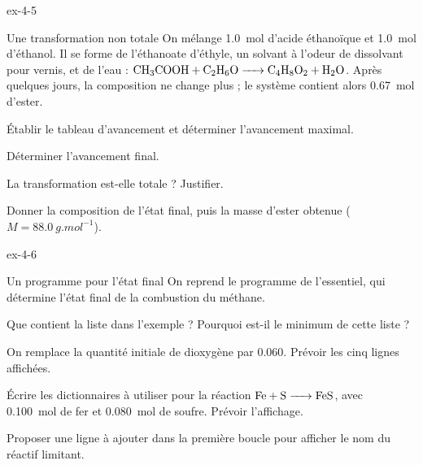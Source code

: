 \begin{blocLivre}{ex-4-5}
\begin{exercice}[1]{Une transformation non totale}
On mélange \qty{1,0}{mol} d'acide éthanoïque et \qty{1,0}{mol} d'éthanol. Il se forme de l'éthanoate d'éthyle, un solvant à l'odeur de
dissolvant pour vernis, et de l'eau : $\ce{CH3COOH + C2H6O -> C4H8O2 + H2O}$. Après quelques jours, la composition ne
change plus ; le système contient alors \qty{0,67}{mol} d'ester.
\begin{questions}
\item Établir le tableau d'avancement et déterminer l'avancement maximal.
\item Déterminer l'avancement final.
\item La transformation est-elle totale ? Justifier.
\item Donner la composition de l'état final, puis la masse d'ester obtenue ($M=\qty{88,0}{g.mol^{-1}}$).
\end{questions}
\end{exercice}
\end{blocLivre}
\begin{blocLivre}{ex-4-6}
\begin{exercice}[2]{Un programme pour l'état final}
On reprend le programme de l'essentiel, qui détermine l'état final de la combustion du méthane.
\begin{questions}
\item {}Que contient la liste  dans l'exemple ? Pourquoi  est-il le minimum de cette liste ?
\item On remplace la quantité initiale de dioxygène par \num{0.060}. Prévoir les cinq lignes affichées.
\item Écrire les dictionnaires à utiliser pour la réaction $\ce{Fe + S -> FeS}$, avec \qty{0,100}{mol} de fer et \qty{0,080}{mol} de soufre.
Prévoir l'affichage.
\item Proposer une ligne à ajouter dans la première boucle pour afficher le nom du réactif limitant.
\end{questions}
\end{exercice}
\end{blocLivre}
